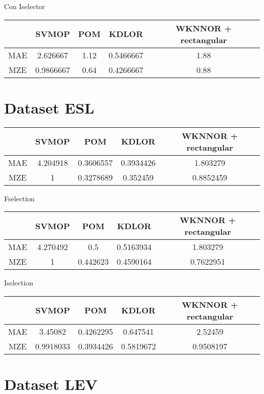 Con Iselector

\begin{tabular}{ c c c c c }
	& SVMOP & POM & KDLOR & WKNNOR + rectangular \\
	\hline	
	MAE &   2.626667  & 	1.12 &  0.5466667 & 1.88  \\
	MZE &	0.9866667  &  0.64 & 0.4266667 & 0.88  \\
	\hline  
\end{tabular}

\section{Dataset ESL}

\begin{tabular}{ c c c c c }
	& SVMOP & POM & KDLOR & WKNNOR + rectangular \\
	\hline	
	MAE &   4.204918  & 0.3606557 &	0.3934426 &  1.803279  \\
	MZE &	1         & 0.3278689 & 0.352459 & 0.8852459  \\
	\hline  
\end{tabular}

Fselection

\begin{tabular}{ c c c c c }
	& SVMOP & POM & KDLOR & WKNNOR + rectangular \\
	\hline	
	MAE &   4.270492  & 0.5      & 0.5163934 &  1.803279  \\
	MZE &	1         & 0.442623 & 0.4590164 & 0.7622951  \\
	\hline  
\end{tabular}

Iselection

\begin{tabular}{ c c c c c }
	& SVMOP & POM & KDLOR & WKNNOR + rectangular \\
	\hline	
	MAE &   3.45082  & 0.4262295 & 0.647541 &  2.52459  \\
	MZE &	0.9918033 & 0.3934426 & 0.5819672 & 0.9508197  \\
	\hline  
\end{tabular}

\section{Dataset LEV}

